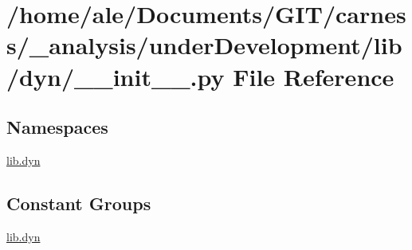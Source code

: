 \hypertarget{a00044}{\section{/home/ale/\-Documents/\-G\-I\-T/carness/\-\_\-analysis/under\-Development/lib/dyn/\-\_\-\-\_\-init\-\_\-\-\_\-.py File Reference}
\label{a00044}
}
\subsection*{Namespaces}
\begin{DoxyCompactItemize}
\item 
\hyperlink{a00103}{lib.\-dyn}
\end{DoxyCompactItemize}
\subsection*{Constant Groups}
\begin{DoxyCompactItemize}
\item 
\hyperlink{a00103}{lib.\-dyn}
\end{DoxyCompactItemize}
